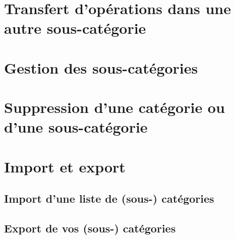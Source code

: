 \section{Transfert d'opérations dans une autre sous-catégorie\label{categories-transfer}}


\section{Gestion des sous-catégories\label{categories-management}}


%
\section{Suppression d'une catégorie ou d'une sous-catégorie\label{categories-delete}}


\section{Import et export\label{categories-importexport} }


\subsection{Import d'une liste de (sous-) catégories\label{categories-importexport-import} }


\subsection{Export de vos (sous-) catégories\label{categories-importexport-export} }


